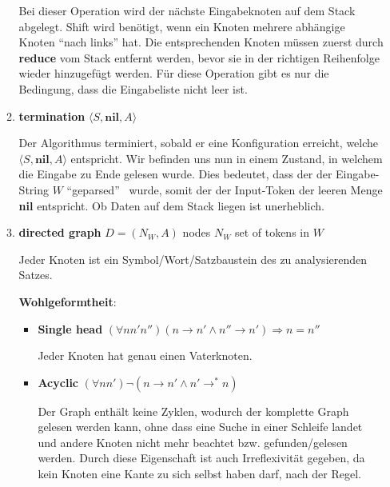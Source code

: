 \documentclass[a4paper]{scrartcl}
\begin{document}
\begin{enumerate}
\begin{enumerate}[label=(\alph*)]
{            Bei dieser Operation wird der nächste Eingabeknoten auf dem Stack abgelegt. Shift wird benötigt, wenn ein Knoten mehrere abhängige Knoten "`nach links"' hat. Die entsprechenden Knoten müssen zuerst durch \textbf{reduce} vom Stack entfernt werden, bevor sie in der richtigen Reihenfolge wieder hinzugefügt werden. Für diese Operation gibt es nur die Bedingung, dass die Eingabeliste nicht leer ist.
        }
			
            \item
            {
            \textbf{termination} $\langle S, \textbf{nil}, A \rangle$
            
            Der Algorithmus terminiert, sobald er eine Konfiguration erreicht, welche $\langle S, \textbf{nil}, A \rangle$ entspricht. Wir befinden uns nun in einem Zustand, in welchem die Eingabe zu Ende gelesen wurde. Dies bedeutet, dass der der Eingabe-String $W$ "`geparsed"' \ wurde, somit der der Input-Token der leeren Menge \textbf{nil} entspricht. Ob Daten auf dem Stack liegen ist unerheblich.
	        }

            \item
            {            
            \textbf{directed graph} $D = (N_W, A)$
            nodes $N_W$ set of tokens in $W$
            
            Jeder Knoten ist ein Symbol/Wort/Satzbaustein des zu analysierenden Satzes.
            
            \textbf{Wohlgeformtheit}: \\
            \begin{itemize}
           
            \item {\textbf{Single head}  $(\forall n n' n'') (n \rightarrow n' \land n'' \rightarrow n') \Rightarrow n = n''$
            
            Jeder Knoten hat genau einen Vaterknoten.
	        }
            
            \item {\textbf{Acyclic}      $(\forall n n') \lnot (n \rightarrow n' \land n' \rightarrow^\ast n)$
            
            Der Graph enthält keine Zyklen, wodurch der komplette Graph gelesen werden kann, ohne dass eine Suche in einer Schleife landet und andere Knoten nicht mehr beachtet bzw. gefunden/gelesen werden. Durch diese Eigenschaft ist auch Irreflexivität gegeben, da kein Knoten eine Kante zu sich selbst haben darf, nach der Regel.
	        }
            

\end{itemize}}
\end{enumerate}
\end{enumerate}
\end{document}
